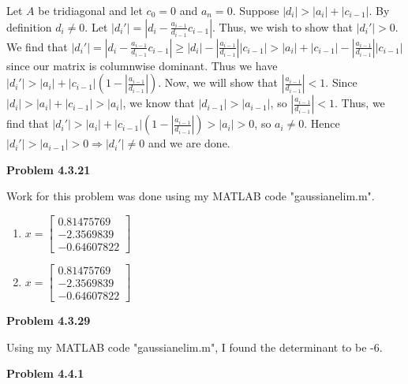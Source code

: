 \documentclass{article}
\newcommand{\Problem}[1]{\textbf{Problem #1}}
\begin{document}
Let $A$ be tridiagonal and let $c_0 = 0$ and $a_n = 0$. Suppose $|d_i| > |a_i| + |c_{i-1}|$. By definition $d_i \neq 0$. Let $|d_i'| = \left|d_i - \frac{a_{i-1}}{d_{i-1}}c_{i-1}\right|$. Thus, we wish to show that $|d_i'| > 0$. We find that $|d_i'| = \left|d_i - \frac{a_{i-1}}{d_{i-1}}c_{i-1}\right| \geq |d_i| -  \left|\frac{a_{i-1}}{d_{i-1}}\right||c_{i-1}| > |a_i| + |c_{i-1}| - \left|\frac{a_{i-1}}{d_{i-1}}\right||c_{i-1}|$ since our matrix is columnwise dominant. Thus we have $|d_i'| > |a_i| + |c_{i-1}|\left(1 - \left|\frac{a_{i-1}}{d_{i-1}}\right|\right)$. Now, we will show that $\left| \frac{a_{i-1}}{d_{i-1}}\right| < 1$. Since $|d_i| > |a_i| + |c_{i-1}| > |a_i|$, we know that $|d_{i-1}| > |a_{i-1}|$, so $\left| \frac{a_{i-1}}{d_{i-1}}\right| < 1$. Thus, we find that $|d_i'| > |a_i| + |c_{i-1}|\left(1 - \left|\frac{a_{i-1}}{d_{i-1}}\right|\right) > |a_i| > 0$, so $a_i \neq 0$. Hence $|d_i'| > |a_{i-1}| > 0 \Rightarrow |d_{i}'| \neq 0$ and we are done. 

\Problem{4.3.21}

Work for this problem was done using my MATLAB code "gaussianelim.m".
\begin{enumerate}
\item $x = \begin{bmatrix} 0.81475769\\ -2.3569839\\ -0.64607822 \end{bmatrix}$	
\item $x = \begin{bmatrix} 0.81475769\\ -2.3569839\\ -0.64607822 \end{bmatrix}$	
\end{enumerate}


\Problem{4.3.29}

Using my MATLAB code "gaussianelim.m", I found the determinant to be -6. 

\Problem{4.4.1}
\end{document}

